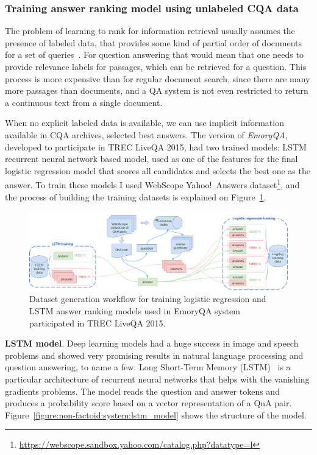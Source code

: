 \subsubsection{Training answer ranking model using unlabeled CQA data}
\label{table:non-factoid:system:cqa_training}

The problem of learning to rank for information retrieval usually assumes the presence of labeled data, that provides some kind of partial order of documents for a set of queries~\cite{liu2009learning}.
For question answering that would mean that one needs to provide relevance labels for passages, which can be retrieved for a question.
This process is more expensive than for regular document search, since there are many more passages than documents, and a QA system is not even restricted to return a continuous text from a single document.

When no explicit labeled data is available, we can use implicit information available in CQA archives, \eg selected best answers.
The version of \textit{EmoryQA}, developed to participate in TREC LiveQA 2015, had two trained models: LSTM recurrent neural network based model, used as one of the features for the final logistic regression model that scores all candidates and selects the best one as the answer.
To train these models I used WebScope Yahoo!~Answers dataset\footnote{\href{url}{https://webscope.sandbox.yahoo.com/catalog.php?datatype=l}}, and the process of building the training datasets is explained on Figure~\ref{figure:non-factoid:system:model_training}.

\begin{figure}[t]
    \includegraphics[width=\textwidth]{img/liveqa_model_training}
    \caption{Dataset generation workflow for training logistic regression and LSTM answer ranking models used in EmoryQA system participated in TREC LiveQA 2015.}
    \label{figure:non-factoid:system:model_training}
\end{figure}

\textbf{LSTM model}.
Deep learning models had a huge success in image and speech problems and showed very promising results in natural language processing and question answering, \eg \cite{yu2014deep,WangN15} to name a few.
Long Short-Term Memory (LSTM)~\cite{hochreiter1997long} is a particular architecture of recurrent neural networks that helps with the vanishing gradients problems.
The model reads the question and answer tokens and produces a probability score based on a vector representation of a QnA pair.
Figure~\ref{figure:non-factoid:system:lstm_model} shows the structure of the model.

